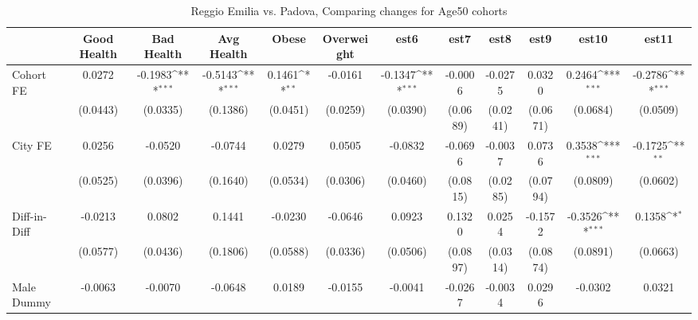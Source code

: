 \begin{table}[htbp]\centering
\def\sym#1{\ifmmode^{#1}\else\(^{#1}\)\fi}
\caption{Reggio Emilia vs. Padova, Comparing changes for Age50 cohorts}
\begin{tabular}{l*{11}{c}}
\toprule
            &\multicolumn{1}{c}{Good Health}&\multicolumn{1}{c}{Bad Health}&\multicolumn{1}{c}{Avg Health}&\multicolumn{1}{c}{Obese}&\multicolumn{1}{c}{Overweight}&\multicolumn{1}{c}{est6}&\multicolumn{1}{c}{est7}&\multicolumn{1}{c}{est8}&\multicolumn{1}{c}{est9}&\multicolumn{1}{c}{est10}&\multicolumn{1}{c}{est11}\\
\midrule
Cohort FE   &      0.0272         &     -0.1983\sym{***}&     -0.5143\sym{***}&      0.1461\sym{**} &     -0.0161         &     -0.1347\sym{***}&     -0.0006         &     -0.0275         &      0.0320         &      0.2464\sym{***}&     -0.2786\sym{***}\\
            &    (0.0443)         &    (0.0335)         &    (0.1386)         &    (0.0451)         &    (0.0259)         &    (0.0390)         &    (0.0689)         &    (0.0241)         &    (0.0671)         &    (0.0684)         &    (0.0509)         \\
\addlinespace
City FE     &      0.0256         &     -0.0520         &     -0.0744         &      0.0279         &      0.0505         &     -0.0832         &     -0.0696         &     -0.0037         &      0.0736         &      0.3538\sym{***}&     -0.1725\sym{**} \\
            &    (0.0525)         &    (0.0396)         &    (0.1640)         &    (0.0534)         &    (0.0306)         &    (0.0460)         &    (0.0815)         &    (0.0285)         &    (0.0794)         &    (0.0809)         &    (0.0602)         \\
\addlinespace
Diff-in-Diff&     -0.0213         &      0.0802         &      0.1441         &     -0.0230         &     -0.0646         &      0.0923         &      0.1320         &      0.0254         &     -0.1572         &     -0.3526\sym{***}&      0.1358\sym{*}  \\
            &    (0.0577)         &    (0.0436)         &    (0.1806)         &    (0.0588)         &    (0.0336)         &    (0.0506)         &    (0.0897)         &    (0.0314)         &    (0.0874)         &    (0.0891)         &    (0.0663)         \\
\addlinespace
Male Dummy  &     -0.0063         &     -0.0070         &     -0.0648         &      0.0189         &     -0.0155         &     -0.0041         &     -0.0267         &     -0.0034         &      0.0296         &     -0.0302         &      0.0321         \\

\end{tabular}
\end{table}
